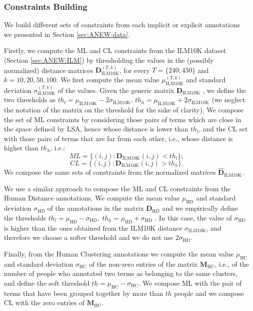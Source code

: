 \subsubsection{Constraints Building}
\label{sec:ANEW:constraints}
We build different sets of constraints from each implicit or explicit annotations we presented in Section \ref{sec:ANEW:data}.

Firstly,  we compute the ML and CL constraints from the ILM10K dataset (Section \ref{sec:ANEW:ILM}) by thresholding the values in the (possibly normalized) distance matrices $\mathbf{D}_{\text{ILM10K}}^{(T,k)}$, for every $T=\{240; 450\}$ and $k=10,20,50,100$. We first compute the mean value $\mu_{\text{ILM10K}}^{(T,k)}$ and standard deviation $\sigma_{\text{ILM10K}}^{(T,k)}$ of the values.
Given the generic matrix $\mathbf{D}_{\text{ILM10K}}$ , we define the two thresholds as $th_l= \mu_{\text{ILM10K}} - 2 \sigma_{\text{ILM10K}} $, $th_h= \mu_{\text{ILM10K}} + 2 \sigma_{\text{ILM10K}} $ (we neglect the notation of the matrix on the threshold for the sake of clarity).  We compose the set of ML constraints by considering those pairs of terms which are close in the space defined by LSA, hence whose distance is lower than $th_l$, and the CL set with those pairs of terms that are far from each other, i.e., whose distance is higher than $th_h$, i.e.:
\begin{equation}
ML=\{ (i, j) : \mathbf{D}_{\text{ILM10K}}(i,j)<th_l    \};
\end{equation}
\begin{equation}
CL=\{ (i, j) : \mathbf{D}_{\text{ILM10K}}(i,j)>th_h    \}.
\end{equation}
We compose the same sets of constraints from the normalized matrices $\mathbf{\hat{D}}_{\text{ILM10K}}$.

We use a similar approach to compose the ML and CL constraints from the Human Distance annotations. We compute the mean value $\mu_{\text{HD}}$ and standard deviation $\sigma_{\text{HD}}$ of the annotations in the matrix $\mathbf{D}_{\text{HD}}$ and we empirically define the thresholds $th_l=\mu_{\text{HD}} - \sigma_{\text{HD}},\; th_h=\mu_{\text{HD}} + \sigma_{\text{HD}}$ . In this case, the value of $\sigma_{\text{HD}}$ is higher than the ones obtained from the ILM10K distance $\sigma_{\text{ILM10K}}$, and therefore we choose a softer threshold and we do not use $2 \sigma_{\text{HD}}$.

Finally, from the Human Clustering annotations we compute the mean value $\mu_{\text{HC}}$ and standard deviation $\sigma_{\text{HC}}$ of the non-zero entries of the matrix $\mathbf{M}_{\text{HC}}$, i.e., of the number of people who annotated two terms as belonging to the same clusters, and define the soft threshold $th= \mu_{\text{HC}} - \sigma_{\text{HC}} $. We compose ML with the pair of terms that have been grouped together by more than $th$ people and we compose CL with the zero entries of $\mathbf{M}_{\text{HC}}$.

